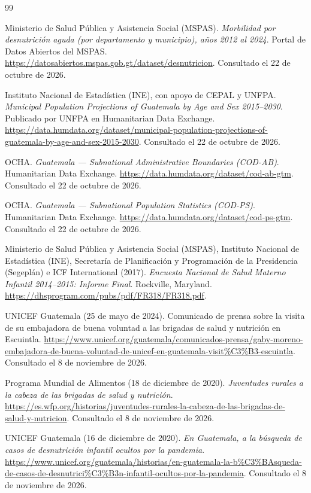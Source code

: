 \documentclass[11pt,letterpaper]{article}
\begin{document}
\begin{thebibliography}{99}

 Ministerio de Salud Pública y Asistencia Social (MSPAS). \emph{Morbilidad por desnutrición aguda (por departamento y municipio), años 2012 al 2024}. Portal de Datos Abiertos del MSPAS. \url{https://datosabiertos.mspas.gob.gt/dataset/desnutricion}. Consultado el 22 de octubre de 2026.

 Instituto Nacional de Estadística (INE), con apoyo de CEPAL y UNFPA. \emph{Municipal Population Projections of Guatemala by Age and Sex 2015--2030}. Publicado por UNFPA en Humanitarian Data Exchange. \url{https://data.humdata.org/dataset/municipal-population-projections-of-guatemala-by-age-and-sex-2015-2030}. Consultado el 22 de octubre de 2026.

 OCHA. \emph{Guatemala --- Subnational Administrative Boundaries (COD-AB)}. Humanitarian Data Exchange. \url{https://data.humdata.org/dataset/cod-ab-gtm}. Consultado el 22 de octubre de 2026.

 OCHA. \emph{Guatemala --- Subnational Population Statistics (COD-PS)}. Humanitarian Data Exchange. \url{https://data.humdata.org/dataset/cod-ps-gtm}. Consultado el 22 de octubre de 2026.

 Ministerio de Salud Pública y Asistencia Social (MSPAS), Instituto Nacional de Estadística (INE), Secretaría de Planificación y Programación de la Presidencia (Segeplán) e ICF International (2017). \emph{Encuesta Nacional de Salud Materno Infantil 2014--2015: Informe Final}. Rockville, Maryland. \url{https://dhsprogram.com/pubs/pdf/FR318/FR318.pdf}.

 UNICEF Guatemala (25 de mayo de 2024). Comunicado de prensa sobre la visita de su embajadora de buena voluntad a las brigadas de salud y nutrición en Escuintla. \url{https://www.unicef.org/guatemala/comunicados-prensa/gaby-moreno-embajadora-de-buena-voluntad-de-unicef-en-guatemala-visit\%C3\%B3-escuintla}. Consultado el 8 de noviembre de 2026.

 Programa Mundial de Alimentos (18 de diciembre de 2020). \emph{Juventudes rurales a la cabeza de las brigadas de salud y nutrición}. \url{https://es.wfp.org/historias/juventudes-rurales-la-cabeza-de-las-brigadas-de-salud-y-nutricion}. Consultado el 8 de noviembre de 2026.

 UNICEF Guatemala (16 de diciembre de 2020). \emph{En Guatemala, a la búsqueda de casos de desnutrición infantil ocultos por la pandemia}. \url{https://www.unicef.org/guatemala/historias/en-guatemala-la-b\%C3\%BAsqueda-de-casos-de-desnutrici\%C3\%B3n-infantil-ocultos-por-la-pandemia}. Consultado el 8 de noviembre de 2026.


\end{thebibliography}
\end{document}
